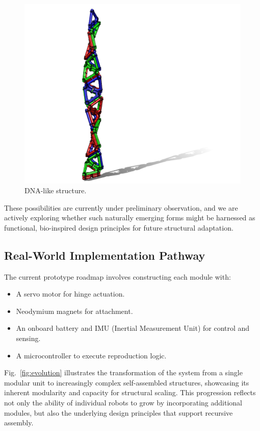 \documentclass[lettersize,journal]{IEEEtran}
\begin{document}
\begin{figure}[H]
    \centering
    \includegraphics[width=1\linewidth]{dna.png}
    \caption{DNA-like structure.}
    \label{fig:dna}
\end{figure}

These possibilities are currently under preliminary observation, and we are actively exploring whether such naturally emerging forms might be harnessed as functional, bio-inspired design principles for future structural adaptation.

\subsection{Real-World Implementation Pathway}
The current prototype roadmap involves constructing each module with:
\begin{itemize}
    \item A servo motor for hinge actuation.
    \item Neodymium magnets for attachment.
    \item An onboard battery and IMU (Inertial Measurement Unit) for control and sensing.
    \item A microcontroller to execute reproduction logic.
\end{itemize}

Fig.~\ref{fig:evolution} illustrates the transformation of the system from a single modular unit to increasingly complex self-assembled structures, showcasing its inherent modularity and capacity for structural scaling. This progression reflects not only the ability of individual robots to grow by incorporating additional modules, but also the underlying design principles that support recursive assembly.
\end{document}
